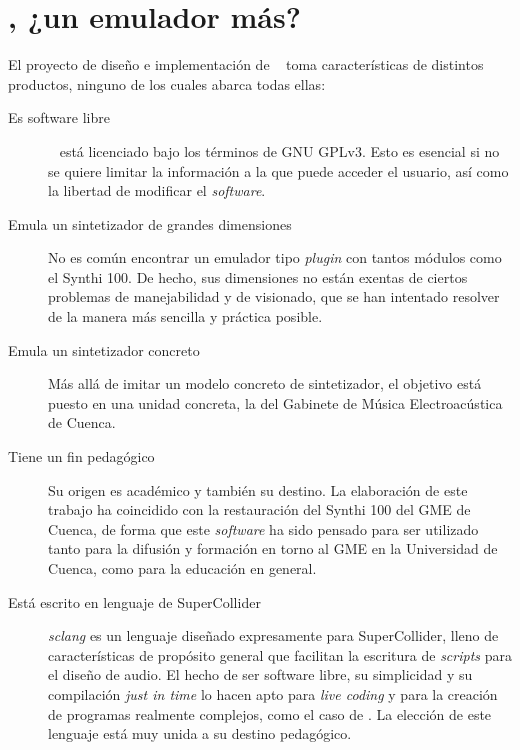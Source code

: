 \section[\appName, ¿un emulador más?]{\appName, ¿un emulador más?}

El proyecto de diseño e implementación de \appName~ toma características de distintos productos, ninguno de los cuales abarca todas ellas:

\begin{description}
	\item[Es software libre] \appName~ está licenciado bajo los términos de GNU GPLv3. Esto es esencial si no se quiere limitar la información a la que puede acceder el usuario, así como la libertad de modificar el \textit{software}. 
	
	\item[Emula un sintetizador de grandes dimensiones] No es común encontrar un emulador tipo \textit{plugin} con tantos módulos como el Synthi 100. De hecho, sus dimensiones no están exentas de ciertos problemas de manejabilidad y de visionado, que se han intentado resolver de la manera más sencilla y práctica posible.
	
	\item[Emula un sintetizador concreto] Más allá de imitar un modelo concreto de sintetizador, el objetivo está puesto en una unidad concreta, la del Gabinete de Música Electroacústica de Cuenca. 
	
	\item[Tiene un fin pedagógico] Su origen es académico y también su destino. La elaboración de este trabajo ha coincidido con la restauración del Synthi 100 del GME de Cuenca, de forma que este \textit{software} ha sido pensado para ser utilizado tanto para la difusión y formación en torno al GME en la Universidad de Cuenca, como para la educación en general. 
	
	\item[Está escrito en lenguaje de SuperCollider] \textit{sclang} es un lenguaje diseñado expresamente para SuperCollider, lleno de características de propósito general que facilitan la escritura de \textit{scripts} para el diseño de audio. El hecho de ser software libre, su simplicidad y su  compilación \textit{just in time} lo hacen apto para \textit{live coding} y para la creación de programas realmente complejos, como el caso de \appName. La elección de este lenguaje está muy unida a su destino pedagógico.
\end{description}



